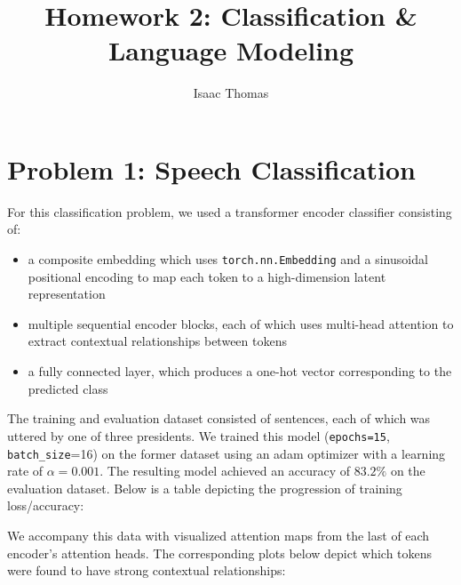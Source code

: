 \documentclass[10pt]{article}
\title{Homework 2: Classification \& Language Modeling}
\author{Isaac Thomas}
\newcommand{\code}[1]{\texttt{#1}}
\theoremstyle{definition}
\begin{document}
\maketitle

\section{Problem 1: Speech Classification}
\noindent For this classification problem, we used a transformer encoder classifier consisting of:
\begin{itemize}
    \item a composite embedding which uses \code{torch.nn.Embedding} and a sinusoidal positional encoding to map each token to a high-dimension latent representation
    \item multiple sequential encoder blocks, each of which uses multi-head attention to extract contextual relationships between tokens
    \item a fully connected layer, which produces a one-hot vector corresponding to the predicted class
\end{itemize}

\noindent The training and evaluation dataset consisted of sentences, each of which was uttered by one of three presidents. We trained this model (\code{epochs=15}, \code{batch\_size}=16) on the former dataset using an adam optimizer with a learning rate of $\alpha = 0.001$. The resulting model achieved an accuracy of $83.2\%$ on the evaluation dataset. Below is a table depicting the progression of training loss/accuracy:\\
\begin{center}
\end{center}

\noindent We accompany this data with visualized attention maps from the last of each encoder's attention heads. The corresponding plots below depict which tokens were found to have strong contextual relationships:
\end{document}
